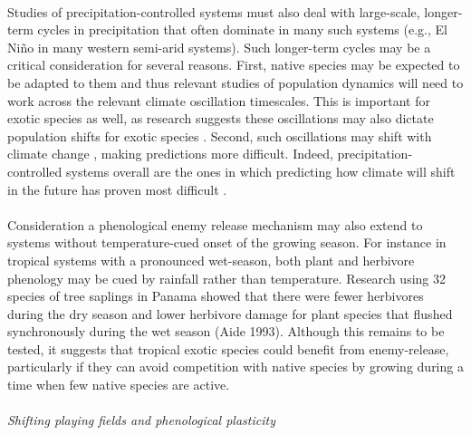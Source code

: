 \documentclass[11pt,a4paper,oneside]{article}
\begin{document}
\\
Studies of precipitation-controlled systems must also deal with large-scale, longer-term cycles in precipitation that often dominate in many such systems (e.g., El Ni\~{n}o in many western semi-arid systems). Such longer-term cycles may be a critical consideration for several reasons. First, native species may be expected to be adapted to them and thus relevant studies of population dynamics will need to work across the relevant climate oscillation timescales. This is important for exotic species as well, as research suggests these oscillations may also dictate population shifts for exotic species \citep{Salo:2005eo}. Second, such oscillations may shift with climate change \citep{ipccPhys2007}, making predictions more difficult. Indeed, precipitation-controlled systems overall are the ones in which predicting how climate will shift in the future has proven most difficult \citep{knutti2013}.\\
\\
Consideration a phenological enemy release mechanism may also extend to systems without temperature-cued onset of the growing season. For instance in tropical systems with a pronounced wet-season, both plant and herbivore phenology may be cued by rainfall rather than temperature. Research using 32 species of tree saplings in Panama showed that there were fewer herbivores during the dry season and lower herbivore damage for plant species that flushed synchronously during the wet season (Aide 1993).  Although this remains to be tested, it suggests that tropical exotic species could benefit from enemy-release, particularly if they can avoid competition with native species by growing during a time when few native species are active.\\
\\
\noindent \emph{Shifting playing fields and phenological plasticity}\\
\end{document}

